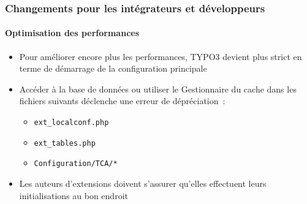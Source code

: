 %

\begin{frame}[fragile]
	\frametitle{Changements pour les intégrateurs et développeurs}
	\framesubtitle{Optimisation des performances}


	\begin{itemize}
		\item Pour améliorer encore plus les performances, TYPO3 devient plus strict en
		    terme de démarrage de la configuration principale
		\item Accéder à la base de données ou utiliser le Gestionnaire du cache dans les fichiers
		 	suivants déclenche une erreur de dépréciation~:
			\begin{itemize}
				\item \texttt{ext\_localconf.php}
				\item \texttt{ext\_tables.php}
				\item \texttt{Configuration/TCA/*}
			\end{itemize}
		\item Les auteurs d'extensions doivent s'assurer qu'elles effectuent leurs initialisations
			au bon endroit
	\end{itemize}
\end{frame}

